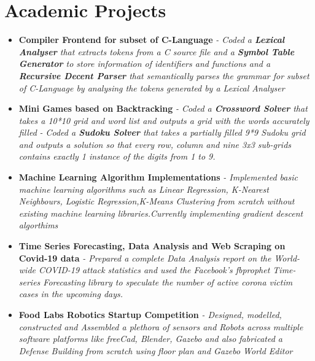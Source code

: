 \documentclass{article}
\begin{document}
\section*{Academic Projects}
\begin{itemize}
    \item{\textbf{\large{Compiler Frontend for subset of C-Language}}}
          \newline
          \textit{- Coded a \textbf{Lexical Analyser} that extracts tokens from a C source file and a \textbf{Symbol Table Generator} to store information of identifiers and functions and a \textbf{Recursive Decent Parser} that semantically parses the grammar for subset of C-Language by analysing the tokens generated by a Lexical Analyser}

    \item{\textbf{\large{Mini Games based on Backtracking}}}
          \newline
          \textit{- Coded a \textbf{Crossword Solver} that takes a 10*10 grid and word list and outputs a grid with the words accurately filled}
          \newline
          \textit{- Coded a \textbf{Sudoku Solver} that takes a partially filled 9*9 Sudoku grid and outputs a solution so that every row, column and nine 3x3 sub-grids contains exactly 1 instance of the digits from 1 to 9.}

    \item{\textbf{\large{Machine Learning Algorithm Implementations}}}
          \newline
          \textit{- Implemented basic machine learning algorithms such as Linear Regression, K-Nearest Neighbours, Logistic Regression,K-Means Clustering from scratch without existing machine learning libraries.Currently implementing gradient descent algorthims}


    \item{\textbf{\large{Time Series Forecasting, Data Analysis and Web Scraping on Covid-19 data}}}
          \newline
          \textit{- Prepared a complete Data Analysis report on the World-wide COVID-19 attack statistics and used the Facebook's fbprophet Time-series Forecasting library to speculate the number of active corona victim cases in the upcoming days.}

    \item{\textbf{\large{Food Labs Robotics Startup Competition}}}
          \newline
          \textit{- Designed, modelled, constructed and
              Assembled a plethora of sensors and Robots across multiple software platforms like
              freeCad, Blender, Gazebo and also fabricated a Defense Building from scratch using floor plan and Gazebo World Editor}


\end{itemize}
\end{document}
